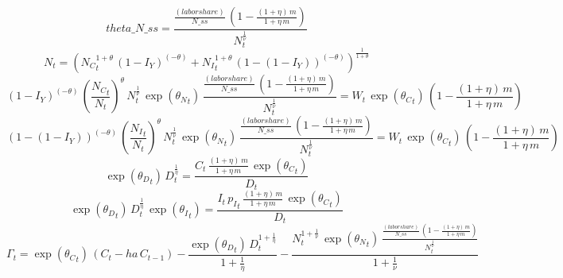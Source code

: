 \begin{dmath*}
theta\_N\_ss = \frac{\frac{{(labor share)}}{{N\_ss}}\, \left(1-\frac{\left(1+{{\eta}}\right)\, {{m}}}{1+{{\eta}}\, {{m}}}\right)}{{{N}}_{t}^{\frac{1}{{\nu}}}}
\end{dmath*}
\begin{dmath}
{{N}}_{t}=\left({{N_C}}_{t}^{1+{{\theta}}}\, \left(1-{{I_Y}}\right)^{\left(-{{\theta}}\right)}+{{N_I}}_{t}^{1+{{\theta}}}\, \left(1-\left(1-{{I_Y}}\right)\right)^{\left(-{{\theta}}\right)}\right)^{\frac{1}{1+{{\theta}}}}
\end{dmath}
\begin{dmath}
\left(1-{{I_Y}}\right)^{\left(-{{\theta}}\right)}\, \left(\frac{{{N_C}}_{t}}{{{N}}_{t}}\right)^{{{\theta}}}\, {{N}}_{t}^{\frac{1}{{\nu}}}\, \exp\left({{\theta_N}}_{t}\right)\, \frac{\frac{{(labor share)}}{{N\_ss}}\, \left(1-\frac{\left(1+{{\eta}}\right)\, {{m}}}{1+{{\eta}}\, {{m}}}\right)}{{{N}}_{t}^{\frac{1}{{\nu}}}}={{W}}_{t}\, \exp\left({{\theta_C}}_{t}\right)\, \left(1-\frac{\left(1+{{\eta}}\right)\, {{m}}}{1+{{\eta}}\, {{m}}}\right)
\end{dmath}
\begin{dmath}
\left(1-\left(1-{{I_Y}}\right)\right)^{\left(-{{\theta}}\right)}\, \left(\frac{{{N_I}}_{t}}{{{N}}_{t}}\right)^{{{\theta}}}\, {{N}}_{t}^{\frac{1}{{\nu}}}\, \exp\left({{\theta_N}}_{t}\right)\, \frac{\frac{{(labor share)}}{{N\_ss}}\, \left(1-\frac{\left(1+{{\eta}}\right)\, {{m}}}{1+{{\eta}}\, {{m}}}\right)}{{{N}}_{t}^{\frac{1}{{\nu}}}}={{W}}_{t}\, \exp\left({{\theta_C}}_{t}\right)\, \left(1-\frac{\left(1+{{\eta}}\right)\, {{m}}}{1+{{\eta}}\, {{m}}}\right)
\end{dmath}
\begin{dmath}
\exp\left({{\theta_D}}_{t}\right)\, {{D}}_{t}^{\frac{1}{{{\eta}}}}=\frac{{{C}}_{t}\, \frac{\left(1+{{\eta}}\right)\, {{m}}}{1+{{\eta}}\, {{m}}}\, \exp\left({{\theta_C}}_{t}\right)}{{{D}}_{t}}
\end{dmath}
\begin{dmath}
\exp\left({{\theta_D}}_{t}\right)\, {{D}}_{t}^{\frac{1}{{{\eta}}}}\, \exp\left({{\theta_I}}_{t}\right)=\frac{{{I}}_{t}\, {{p_I}}_{t}\, \frac{\left(1+{{\eta}}\right)\, {{m}}}{1+{{\eta}}\, {{m}}}\, \exp\left({{\theta_C}}_{t}\right)}{{{D}}_{t}}
\end{dmath}
\begin{dmath}
{{\Gamma}}_{t}=\exp\left({{\theta_C}}_{t}\right)\, \left({{C}}_{t}-{{ha}}\, {{C}}_{t-1}\right)-\frac{\exp\left({{\theta_D}}_{t}\right)\, {{D}}_{t}^{1+\frac{1}{{{\eta}}}}}{1+\frac{1}{{{\eta}}}}-\frac{{{N}}_{t}^{1+\frac{1}{{\nu}}}\, \exp\left({{\theta_N}}_{t}\right)\, \frac{\frac{{(labor share)}}{{N\_ss}}\, \left(1-\frac{\left(1+{{\eta}}\right)\, {{m}}}{1+{{\eta}}\, {{m}}}\right)}{{{N}}_{t}^{\frac{1}{{\nu}}}}}{1+\frac{1}{{\nu}}}
\end{dmath}
